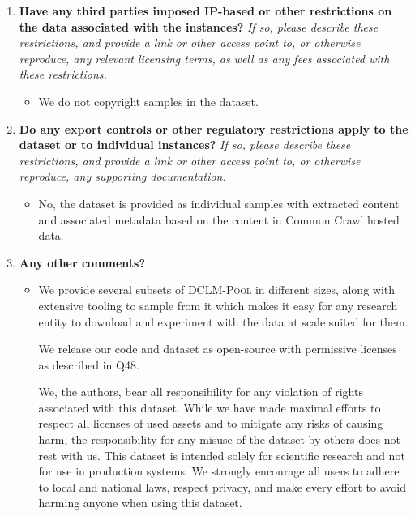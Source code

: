 \documentclass{article}
\newcommand{\rawpool}{\textsc{DCLM-Pool}\xspace}
\newcommand{\commoncrawl}{Common Crawl\xspace}
\begin{document}
\begin{enumerate}[label=Q\arabic*, resume]
\item \textbf{Have any third parties imposed IP-based or other restrictions on the data associated with the instances?} \textit{If so, please describe these restrictions, and provide a link or other access point to, or otherwise reproduce, any relevant licensing terms, as well as any fees associated with these restrictions.}

\begin{itemize}
\item We do not copyright samples in the dataset.
\end{itemize}

\item \textbf{Do any export controls or other regulatory restrictions apply to the dataset or to individual instances?} \textit{If so, please describe these restrictions, and provide a link or other access point to, or otherwise reproduce, any supporting documentation.}

\begin{itemize}
\item No, the dataset is provided as individual samples with extracted content and associated metadata based on the content in \commoncrawl hosted data.
\end{itemize}

\item \textbf{Any other comments?}

\begin{itemize}
\item We provide several subsets of \rawpool in different sizes, along with extensive tooling to sample from it which makes it easy for any research entity to download and experiment with the data at scale suited for them.

We release our code and dataset as open-source with permissive licenses as described in Q48.

We, the authors, bear all responsibility for any violation of rights associated with this dataset. While we have made maximal efforts to respect all licenses of used assets and to mitigate any risks of causing harm, the responsibility for any misuse of the dataset by others does not rest with us. This dataset is intended solely for scientific research and not for use in production systems. We strongly encourage all users to adhere to local and national laws, respect privacy, and make every effort to avoid harming anyone when using this dataset.
\end{itemize}

\end{enumerate}
\end{document}
